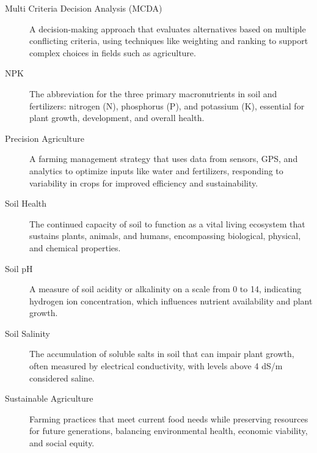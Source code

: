{\begin{description}
	\item[Multi Criteria Decision Analysis (MCDA)]
	A decision-making approach that evaluates alternatives based on multiple conflicting criteria, using techniques like weighting and ranking to support complex choices in fields such as agriculture.
	\item[NPK]
	The abbreviation for the three primary macronutrients in soil and fertilizers: nitrogen (N), phosphorus (P), and potassium (K), essential for plant growth, development, and overall health.
	\item[Precision Agriculture]
	A farming management strategy that uses data from sensors, GPS, and analytics to optimize inputs like water and fertilizers, responding to variability in crops for improved efficiency and sustainability.
	\item[Soil Health]
	The continued capacity of soil to function as a vital living ecosystem that sustains plants, animals, and humans, encompassing biological, physical, and chemical properties.
	\item[Soil pH]
	A measure of soil acidity or alkalinity on a scale from 0 to 14, indicating hydrogen ion concentration, which influences nutrient availability and plant growth.
	\item[Soil Salinity]
	The accumulation of soluble salts in soil that can impair plant growth, often measured by electrical conductivity, with levels above 4 dS/m considered saline.
	\item[Sustainable Agriculture]
	Farming practices that meet current food needs while preserving resources for future generations, balancing environmental health, economic viability, and social equity.
	
	\end{description}
}
